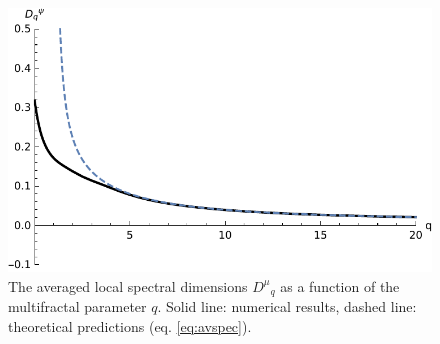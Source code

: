 \documentclass[aps,prl,preprint]{revtex4-1}
\newcommand{\avspec}{\ensuremath{D^\mu}}
\begin{document}
\begin{figure}[htp]
	\centering
	\includegraphics[width=.5\textwidth]{img/average_local_spectral_dimension_rho_10.pdf}
	\caption{The averaged local spectral dimensions $\avspec_q$ as a function of the multifractal parameter $q$. Solid line: numerical results, dashed line: theoretical predictions (eq. \eqref{eq:avspec}).}
	\label{fig:avspec}
\end{figure}
\end{document}
